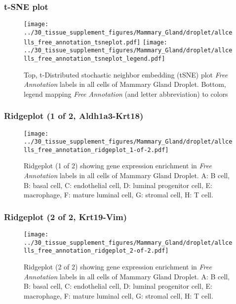 \subsubsection{t-SNE plot}
\begin{figure}[h]
\centering
\texttt{[image: ../30\_tissue\_supplement\_figures/Mammary\_Gland/droplet/allcells\_free\_annotation\_tsneplot.pdf]}
\texttt{[image: ../30\_tissue\_supplement\_figures/Mammary\_Gland/droplet/allcells\_free\_annotation\_tsneplot\_legend.pdf]}
\caption{Top, t-Distributed stochastic neighbor embedding (tSNE) plot  \emph{Free Annotation} labels in all cells of Mammary Gland Droplet. Bottom, legend mapping \emph{Free Annotation} (and letter abbreviation) to colors}
\end{figure}


\clearpage

\subsubsection{Ridgeplot (1 of 2, Aldh1a3-Krt18)}
\begin{figure}[h]
\centering
\texttt{[image: ../30\_tissue\_supplement\_figures/Mammary\_Gland/droplet/allcells\_free\_annotation\_ridgeplot\_1-of-2.pdf]}

\caption{ Ridgeplot (1 of 2)  showing gene expression enrichment in \emph{Free Annotation} labels in all cells of Mammary Gland Droplet. A: B cell, B: basal cell, C: endothelial cell, D: luminal progenitor cell, E: macrophage, F: mature luminal cell, G: stromal cell, H: T cell.}
\end{figure}


\clearpage

\subsubsection{Ridgeplot (2 of 2, Krt19-Vim)}
\begin{figure}[h]
\centering
\texttt{[image: ../30\_tissue\_supplement\_figures/Mammary\_Gland/droplet/allcells\_free\_annotation\_ridgeplot\_2-of-2.pdf]}

\caption{ Ridgeplot (2 of 2)  showing gene expression enrichment in \emph{Free Annotation} labels in all cells of Mammary Gland Droplet. A: B cell, B: basal cell, C: endothelial cell, D: luminal progenitor cell, E: macrophage, F: mature luminal cell, G: stromal cell, H: T cell.}
\end{figure}


